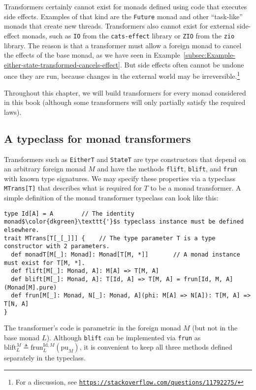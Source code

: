 Transformers certainly cannot exist for monads defined using code
that executes side effects. Examples of that kind are the \lstinline!Future!
monad and other \textsf{``}task-like\textsf{''} monads that create new threads. Transformers
also cannot exist for external side-effect monads, such as \lstinline!IO!
from the \lstinline!cats-effect! library or \lstinline!ZIO! from
the \lstinline!zio! library. The reason is that a transformer must
allow a foreign monad to cancel the effects of the base monad, as
we have seen in Example~\ref{subsec:Example-either-state-transformed-cancels-effect}.
But side effects often cannot be undone once they are run, because
changes in the external world may be irreversible.\footnote{For a discussion, see \texttt{\href{https://stackoverflow.com/questions/11792275/}{https://stackoverflow.com/questions/11792275/}}} 

Throughout this chapter, we will build transformers for every monad
considered in this book (although some transformers will only partially
satisfy the required laws).

\subsection{A typeclass for monad transformers}

Transformers such as \lstinline!EitherT! and \lstinline!StateT!
are type constructors that depend on an arbitrary foreign monad $M$
and have the methods \lstinline!flift!, \lstinline!blift!, and \lstinline!frun!
with known type signatures. We may specify these properties via a
typeclass \lstinline!MTrans[T]! that describes what is required for
$T$ to be a monad transformer. A simple definition of the monad transformer
typeclass can look like this:
\begin{lstlisting}[mathescape=true]
type Id[A] = A        // The identity monad$\color{dkgreen}\texttt{'}$s typeclass instance must be defined elsewhere.
trait MTrans[T[_[_]]] {    // The type parameter T is a type constructor with 2 parameters.
  def monadT[M[_]: Monad]: Monad[T[M, *]]       // A monad instance must exist for T[M, *].
  def flift[M[_]: Monad, A]: M[A] => T[M, A]
  def blift[M[_]: Monad, A]: T[Id, A] => T[M, A] = frun[Id, M, A](Monad[M].pure)
  def frun[M[_]: Monad, N[_]: Monad, A](phi: M[A] => N[A]): T[M, A] => T[N, A]
}
\end{lstlisting}
The transformer\textsf{'}s code is parametric in the foreign monad $M$ (but
not in the base monad $L$). Although \lstinline!blift! can be implemented
via \lstinline!frun! as $\text{blift}_{L}^{M}\triangleq\text{frun}_{L}^{\text{Id},M}(\text{pu}_{M})$,
it is convenient to keep all three methods defined separately in the
typeclass.

